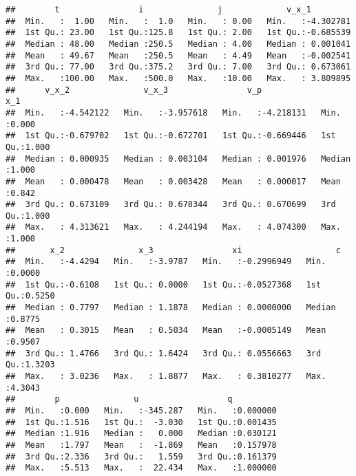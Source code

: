 \documentclass[
]{book}
\newenvironment{Shaded}{\begin{snugshade}}{\end{snugshade}}
\newcommand{\FunctionTok}[1]{\textcolor[rgb]{0.13,0.29,0.53}{\textbf{#1}}}
\newcommand{\NormalTok}[1]{#1}
\newcommand{\SpecialCharTok}[1]{\textcolor[rgb]{0.81,0.36,0.00}{\textbf{#1}}}
\begin{document}
\begin{verbatim}
##        t                i               j             v_x_1          
##  Min.   :  1.00   Min.   :  1.0   Min.   : 0.00   Min.   :-4.302781  
##  1st Qu.: 23.00   1st Qu.:125.8   1st Qu.: 2.00   1st Qu.:-0.685539  
##  Median : 48.00   Median :250.5   Median : 4.00   Median : 0.001041  
##  Mean   : 49.67   Mean   :250.5   Mean   : 4.49   Mean   :-0.002541  
##  3rd Qu.: 77.00   3rd Qu.:375.2   3rd Qu.: 7.00   3rd Qu.: 0.673061  
##  Max.   :100.00   Max.   :500.0   Max.   :10.00   Max.   : 3.809895  
##      v_x_2               v_x_3                v_p                 x_1       
##  Min.   :-4.542122   Min.   :-3.957618   Min.   :-4.218131   Min.   :0.000  
##  1st Qu.:-0.679702   1st Qu.:-0.672701   1st Qu.:-0.669446   1st Qu.:1.000  
##  Median : 0.000935   Median : 0.003104   Median : 0.001976   Median :1.000  
##  Mean   : 0.000478   Mean   : 0.003428   Mean   : 0.000017   Mean   :0.842  
##  3rd Qu.: 0.673109   3rd Qu.: 0.678344   3rd Qu.: 0.670699   3rd Qu.:1.000  
##  Max.   : 4.313621   Max.   : 4.244194   Max.   : 4.074300   Max.   :1.000  
##       x_2               x_3                xi                   c         
##  Min.   :-4.4294   Min.   :-3.9787   Min.   :-0.2996949   Min.   :0.0000  
##  1st Qu.:-0.6108   1st Qu.: 0.0000   1st Qu.:-0.0527368   1st Qu.:0.5250  
##  Median : 0.7797   Median : 1.1878   Median : 0.0000000   Median :0.8775  
##  Mean   : 0.3015   Mean   : 0.5034   Mean   :-0.0005149   Mean   :0.9507  
##  3rd Qu.: 1.4766   3rd Qu.: 1.6424   3rd Qu.: 0.0556663   3rd Qu.:1.3203  
##  Max.   : 3.0236   Max.   : 1.8877   Max.   : 0.3810277   Max.   :4.3043  
##        p               u                  q           
##  Min.   :0.000   Min.   :-345.287   Min.   :0.000000  
##  1st Qu.:1.516   1st Qu.:  -3.030   1st Qu.:0.001435  
##  Median :1.916   Median :   0.000   Median :0.030121  
##  Mean   :1.797   Mean   :  -1.869   Mean   :0.157978  
##  3rd Qu.:2.336   3rd Qu.:   1.559   3rd Qu.:0.161379  
##  Max.   :5.513   Max.   :  22.434   Max.   :1.000000
\end{verbatim}

\begin{Shaded}
\end{Shaded}
\end{document}
